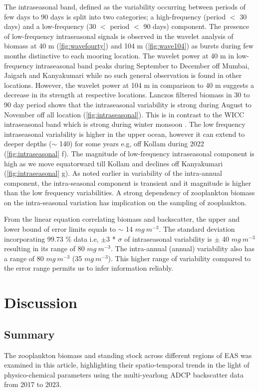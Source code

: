 \documentclass{article}
\begin{document}
    The intraseasonal band, defined as the variability occurring between periods of few days to 90 days is split into two categories; a high-frequency (period $<$ 30 days) and a low-frequency (30 $<$ period $<$ 90 days) component. The presence of low-frequency intraseasonal signals is observed in the wavelet analysis of biomass at 40 m (\cref{fig:wavefourty}) and 104 m (\cref{fig:wave104}) as bursts during few months distinctive to each mooring location. The wavelet power at 40 m in low-frequency intraseasonal band peaks during September to December off Mumbai, Jaigarh and Kanyakumari while no such general observation is found in other locations. However, the wavelet power at 104 m in comparison to 40 m suggests a decrease in its strength at respective locations. Lanczos filtered biomass in 30 to 90 day period shows that the intraseasonal variability is strong during August to November off all location (\cref{fig:intraseasonal}). This is in contrast to the WICC intraseasonal band which is strong during winter monsoon \citep{amol2014observed, chaudhuri2020observed}. The low frequency intraseasonal variability is higher in the upper ocean, however it can extend to deeper depths ($\sim$ 140) for some years e.g, off Kollam during 2022 (\cref{fig:intraseasonal} f). The magnitude of low-frequency intraseasonal component is high as we move equatorward till Kollam and declines off Kanyakumari (\cref{fig:intraseasonal} g). As noted earlier in variability of the intra-annual component, the intra-seasonal component is transient and it magnitude is higher than the low frequency variabilities. A strong dependency of zooplankton biomass on the intra-seasonal variation has implication on the sampling of zooplankton. 
	
	From the linear equation correlating biomass and backscatter, the upper and lower bound of error limits equals to $\sim$  14 $ mg\ m^{-3}$. The standard deviation incorporating 99.73 \% data i.e, $\pm$3 * $\sigma$ of intraseasonal variability is $\pm$ 40 $mg \ m^{-3}$ resulting in its range of 80 $mg\ m^{-3}$. The intra-annual (annual) variability also has a range of 80 $mg\ m^{-3}$ (35 $mg\ m^{-3}$). This higher range of variability compared to the error range permits us to infer information reliably. 
		
	\section{Discussion}
	
	\subsection{Summary}
	The zooplankton biomass and standing stock across different regions of EAS was examined in this article, highlighting their spatio-temporal trends in the light of physico-chemical parameters using the multi-yearlong ADCP backscatter data from 2017 to 2023. 
	
\end{document}
